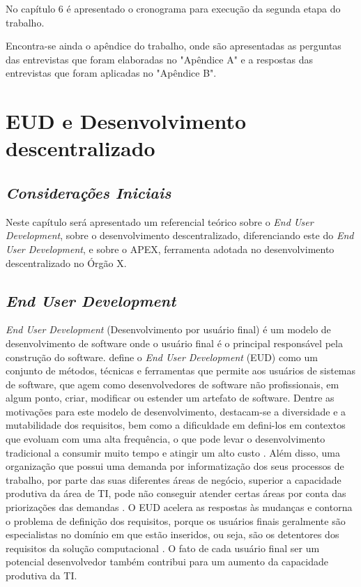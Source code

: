 No capítulo 6 é apresentado o cronograma para execução da segunda etapa do trabalho.

Encontra-se ainda o apêndice do trabalho, onde são apresentadas as perguntas das entrevistas que foram elaboradas no "Apêndice A" e a respostas das entrevistas que foram aplicadas no "Apêndice B".

\chapter[EUD e Desenvolvimento descentralizado]{EUD e Desenvolvimento descentralizado}

\section{\textit{Considerações Iniciais}}

Neste capítulo será apresentado um referencial teórico sobre o \textit{End User Development}, sobre o desenvolvimento descentralizado, diferenciando este do \textit{End User Development}, e sobre o APEX, ferramenta adotada no desenvolvimento descentralizado no Órgão X.

\section{\textit{End User Development}}

\textit{End User Development} (Desenvolvimento por usuário final) é um modelo de desenvolvimento de software onde o usuário final é o principal responsável pela construção do software.  define o \textit{End User Development} (EUD) como um conjunto de métodos, técnicas e ferramentas que permite aos usuários de sistemas de software, que agem como desenvolvedores de software não profissionais, em algum ponto, criar, modificar ou estender um artefato de software. Dentre as motivações para este modelo de desenvolvimento, destacam-se a diversidade e a mutabilidade dos requisitos, bem como a dificuldade em defini-los em contextos que evoluam com uma alta frequência, o que pode levar o desenvolvimento tradicional a consumir muito tempo e atingir um alto custo \cite{lieberman2006}. Além disso, uma organização que possui uma demanda por informatização dos seus processos de trabalho, por parte das suas diferentes áreas de negócio, superior a capacidade produtiva da área de TI, pode não conseguir atender certas áreas por conta das priorizações das demandas \cite{artigoTcuGovTI}. O EUD acelera as respostas às mudanças e contorna o problema de definição dos requisitos, porque os usuários finais geralmente são especialistas no domínio em que estão inseridos, ou seja, são os detentores dos requisitos da solução computacional \cite{fischer2004}. O fato de cada usuário final ser um potencial desenvolvedor também contribui para um aumento da capacidade produtiva da TI.

